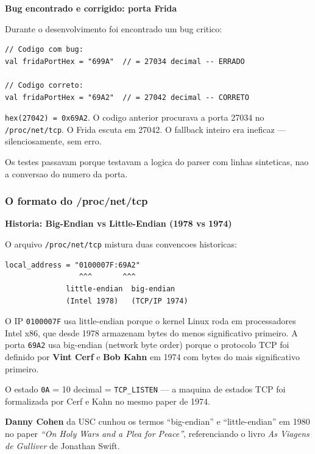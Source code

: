 \documentclass[12pt,a4paper]{article}
\begin{document}
\begin{historybox}
\textbf{Bug encontrado e corrigido: porta Frida}

Durante o desenvolvimento foi encontrado um bug critico:

\begin{lstlisting}
// Codigo com bug:
val fridaPortHex = "699A"  // = 27034 decimal -- ERRADO

// Codigo correto:
val fridaPortHex = "69A2"  // = 27042 decimal -- CORRETO
\end{lstlisting}

\texttt{hex(27042) = 0x69A2}. O codigo anterior procurava a porta 27034
no \texttt{/proc/net/tcp}. O Frida escuta em 27042. O fallback inteiro
era ineficaz --- silenciosamente, sem erro.

Os testes passavam porque testavam a logica do parser com linhas
sinteticas, nao a conversao do numero da porta.
\end{historybox}

\subsubsection{O formato do /proc/net/tcp}

\begin{historybox}
\textbf{Historia: Big-Endian vs Little-Endian (1978 vs 1974)}

O arquivo \texttt{/proc/net/tcp} mistura duas convencoes historicas:

\begin{lstlisting}
local_address = "0100007F:69A2"
                 ^^^       ^^^
              little-endian  big-endian
              (Intel 1978)   (TCP/IP 1974)
\end{lstlisting}

O IP \texttt{0100007F} usa little-endian porque o kernel Linux roda em
processadores Intel x86, que desde 1978 armazenam bytes do menos significativo
primeiro. A porta \texttt{69A2} usa big-endian (network byte order) porque o
protocolo TCP foi definido por \textbf{Vint Cerf} e \textbf{Bob Kahn} em 1974
com bytes do mais significativo primeiro.

O estado \texttt{0A} = 10 decimal = \texttt{TCP\_LISTEN} --- a maquina de
estados TCP foi formalizada por Cerf e Kahn no mesmo paper de 1974.

\textbf{Danny Cohen} da USC cunhou os termos ``big-endian'' e ``little-endian''
em 1980 no paper \textit{``On Holy Wars and a Plea for Peace''}, referenciando
o livro \textit{As Viagens de Gulliver} de Jonathan Swift.
\end{historybox}
\end{document}
